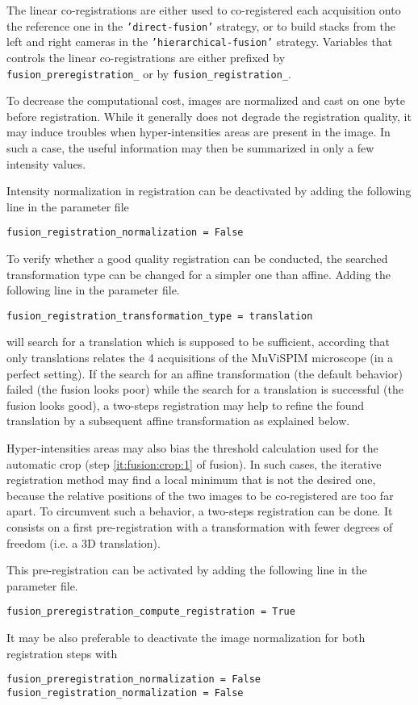 The linear co-registrations are either used to co-registered each acquisition onto the reference one in the \texttt{'direct-fusion'} strategy, or to build stacks from the left and right cameras in the \texttt{'hierarchical-fusion'} strategy.
Variables that controls the linear co-registrations are either prefixed by \texttt{fusion\_preregistration\_} or by \texttt{fusion\_registration\_}.

To decrease the computational cost, images are normalized and cast on one byte before registration. While it generally does not degrade the registration quality, it may induce troubles when hyper-intensities areas are present in the image. In such a case, the useful information may then be summarized in only a few intensity values.

Intensity normalization in registration can be deactivated by adding the following line in the parameter file
\begin{verbatim}
fusion_registration_normalization = False
\end{verbatim}

To verify whether a good quality registration can be conducted, the searched transformation type can be changed for a simpler one than affine. 
Adding the following line in the parameter file.
\begin{verbatim}
fusion_registration_transformation_type = translation
\end{verbatim}
will search for a translation which is supposed to be sufficient, according that only translations relates the 4 acquisitions of the MuViSPIM microscope (in a perfect setting). If the search for an affine transformation (the default behavior) failed (the fusion looks poor) while the search for a translation is successful (the fusion looks good), a two-steps registration may help to refine the found translation by a subsequent affine transformation as explained below.

Hyper-intensities areas may also bias the threshold calculation used for the automatic crop (step \ref{it:fusion:crop:1} of fusion). In such cases, the iterative registration method may find a local minimum that is not the desired one, because the relative positions of the two images to be co-registered are too far apart. To circumvent such a behavior, a two-steps registration can be done. It consists on a first pre-registration with a transformation with fewer degrees of freedom (i.e. a 3D translation). 

This pre-registration can be activated by adding the following line in the parameter file.
\begin{verbatim}
fusion_preregistration_compute_registration = True
\end{verbatim}
It may be also preferable to  deactivate the image normalization for both registration steps with
\begin{verbatim}
fusion_preregistration_normalization = False
fusion_registration_normalization = False
\end{verbatim}

